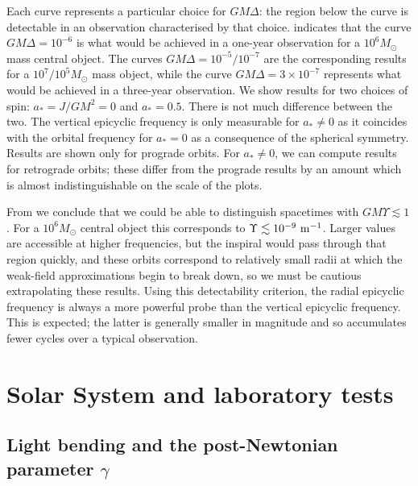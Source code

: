 Each curve represents a particular choice for $GM\Delta$: the region below the curve is detectable in an observation characterised by that choice.  indicates that the curve $GM\Delta = 10^{-6}$ is what would be achieved in a one-year observation for a $10^6 M_\odot$ mass central object. The curves $GM\Delta = 10^{-5}/10^{-7}$ are the corresponding results for a $10^7/10^5M_\odot$ mass object, while the curve $GM\Delta = 3 \times 10^{-7}$ represents what would be achieved in a three-year observation. We show results for two choices of spin: $a_\ast = J/GM^2 = 0$ and $a_\ast = 0.5$. There is not much difference between the two. The vertical epicyclic frequency is only measurable for $a_\ast \neq 0$ as it coincides with the orbital frequency for $a_\ast = 0$ as a consequence of the spherical symmetry. Results are shown only for prograde orbits. For $a_\ast \neq 0$, we can compute results for retrograde orbits; these differ from the prograde results by an amount which is almost indistinguishable on the scale of the plots.

From  we conclude that we could be able to distinguish spacetimes with $GM\Upsilon \lesssim 1 $. For a $10^6 M_\odot$ central object this corresponds to $\Upsilon \lesssim 10^{-9}~\mathrm{m^{-1}}$. Larger values are accessible at higher frequencies, but the inspiral would pass through that region quickly, and these orbits correspond to relatively small radii at which the weak-field approximations begin to break down, so we must be cautious extrapolating these results. Using this detectability criterion, the radial epicyclic frequency is always a more powerful probe than the vertical epicyclic frequency. This is expected; the latter is generally smaller in magnitude and so accumulates fewer cycles over a typical observation.

\section{Solar System and laboratory tests\label{sec:Tests}}

\subsection{Light bending and the post-Newtonian parameter $\gamma$}

